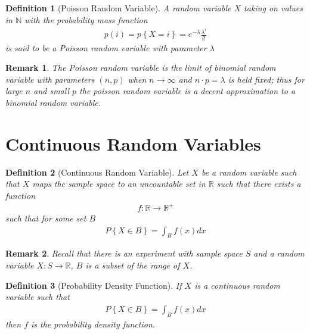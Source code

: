 \documentclass[11pt, oneside]{book}   	%
\newtheorem{definition}{Definition}[chapter]
\newtheorem{remark}{Remark}[chapter]
\begin{document}
\begin{spacing}{1.618}
\begin{definition}[Poisson Random Variable]
	A random variable $X$ taking on values in $\mathbb{N}$ with the probability mass function 
	\begin{alignat}{4}
		p(i)=p\left\{X=i\right\} = e^{-\lambda}\frac{\lambda^i}{i!}
	\end{alignat}
	is said to be a Poisson random variable with parameter $\lambda$
\end{definition}

\begin{remark}
	The Poisson random variable is the limit of binomial random variable with parameters $(n, p)$ when $n\to\infty$ and $n\cdot p=\lambda$ is held fixed; thus for large $n$ and small $p$ the poisson random variable is a decent approximation to a binomial random variable. 
\end{remark}

\section{Continuous Random Variables}

\begin{definition}[Continuous Random Variable]
	Let $X$ be a random variable such that $X$ maps the sample space to an uncountable set in $\mathbb{R}$ such that there exists a function
	\begin{alignat}{4}
		f:\mathbb{R}\to\mathbb{R}^+
	\end{alignat}
	such that for some set $B$ 
	\begin{alignat}{4}
		P\left\{X\in B\right\} = \int_{B}f(x)dx
	\end{alignat}
\end{definition}

\begin{remark}
	Recall that there is an experiment with sample space $S$ and a random variable $X:S\to\mathbb{R}$, $B$ is a subset of the range of $X$. 
\end{remark}

\begin{definition}[Probability Density Function]
	If $X$ is a continuous random variable such that 
	\begin{alignat}{4}
		P\left\{X\in B\right\}=\int_Bf(x)dx
	\end{alignat}
	then $f$ is the probability density function. 
\end{definition}


\end{spacing}
\end{document}
